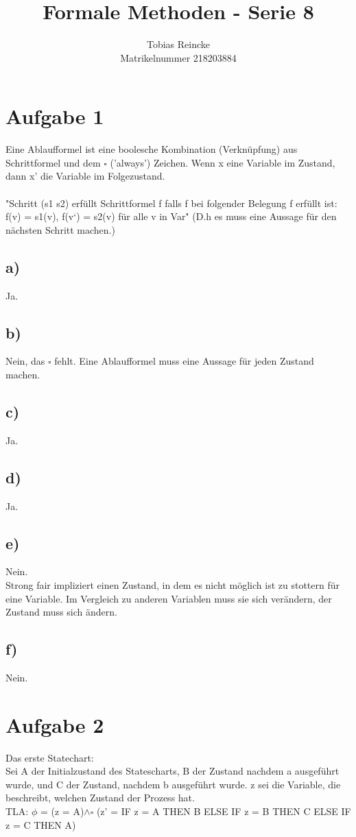 \documentclass[]{article}
\title{Formale Methoden - Serie 8}
\author{Tobias Reincke \\ Matrikelnummer 218203884}
\date{}
\begin{document}
\maketitle



\section*{Aufgabe 1}
   Eine Ablaufformel ist eine boolesche Kombination (Verknüpfung) aus Schrittformel und dem $\square$ ('always') Zeichen. Wenn x eine Variable im Zustand, dann x' die Variable im Folgezustand.
   \\ \\
   "Schritt (s1 s2) erfüllt Schrittformel f falls f bei folgender Belegung f erfüllt ist:
   f(v) = s1(v), f(v‘) = s2(v) für alle v in Var" (D.h es muss eine Aussage für den nächsten Schritt machen.)
	\subsection*{a)} Ja. 
    \subsection*{b)} Nein, das $\square$ fehlt. Eine Ablaufformel muss eine Aussage für jeden Zustand machen.
	\subsection*{c)} Ja.
	\subsection*{d)} Ja.
	\subsection*{e)} Nein. \\ Strong fair impliziert einen Zustand, in dem es nicht möglich ist zu stottern für eine Variable. Im Vergleich zu anderen Variablen muss sie sich verändern, der Zustand muss sich ändern.
	\subsection*{f)} Nein. 

\section*{Aufgabe 2}
Das erste Statechart: \\
Sei A der Initialzustand des Statescharts, B der Zustand nachdem a ausgeführt wurde, und C der Zustand, nachdem b ausgeführt wurde. z sei die Variable, die beschreibt, welchen Zustand der Prozess hat.\\
TLA: $\phi$ = (z = A)$\land \square$ (z' = IF z = A THEN B ELSE IF z = B THEN C ELSE IF z = C THEN A) \\ \\
\end{document}
